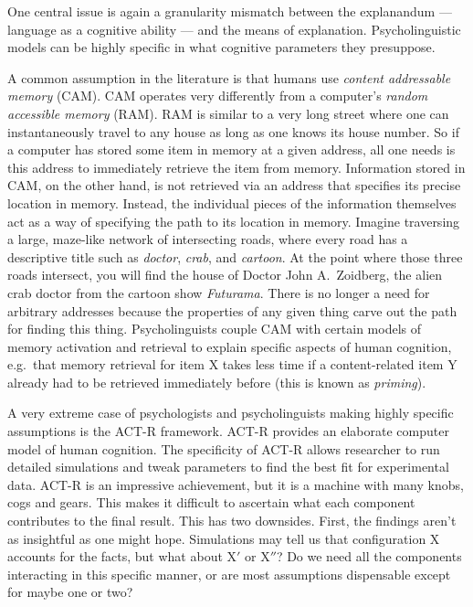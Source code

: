 One central issue is again a granularity mismatch between the explanandum --- language as a cognitive ability --- and the means of explanation.
Psycholinguistic models can be highly specific in what cognitive parameters they presuppose.
%
\begin{examplebox}
    A common assumption in the literature is that humans use \emph{content addressable memory} (CAM).
    CAM operates very differently from a computer's \emph{random accessible memory} (RAM).
    RAM is similar to a very long street where one can instantaneously travel to any house as long as one knows its house number.
    So if a computer has stored some item in memory at a given address, all one needs is this address to immediately retrieve the item from memory.
    Information stored in CAM, on the other hand, is not retrieved via an address that specifies its precise location in memory.
    Instead, the individual pieces of the information themselves act as a way of specifying the path to its location in memory.
    Imagine traversing a large, maze-like network of intersecting roads, where every road has a descriptive title such as \emph{doctor}, \emph{crab}, and \emph{cartoon}. 
    At the point where those three roads intersect, you will find the house of Doctor John A.~Zoidberg, the alien crab doctor from the cartoon show \emph{Futurama}.
    There is no longer a need for arbitrary addresses because the properties of any given thing carve out the path for finding this thing.
    Psycholinguists couple CAM with certain models of memory activation and retrieval to explain specific aspects of human cognition, e.g.~that memory retrieval for item X takes less time if a content-related item Y already had to be retrieved immediately before (this is known as \emph{priming}).
\end{examplebox}
%
A very extreme case of psychologists and psycholinguists making highly specific assumptions is the ACT-R framework.
ACT-R provides an elaborate computer model of human cognition.
The specificity of ACT-R allows researcher to run detailed simulations and tweak parameters to find the best fit for experimental data.
ACT-R is an impressive achievement, but it is a machine with many knobs, cogs and gears.
This makes it difficult to ascertain what each component contributes to the final result.
This has two downsides.
First, the findings aren't as insightful as one might hope.
Simulations may tell us that configuration X accounts for the facts, but what about X$'$ or X$''$?
Do we need all the components interacting in this specific manner, or are most assumptions dispensable except for maybe one or two?

